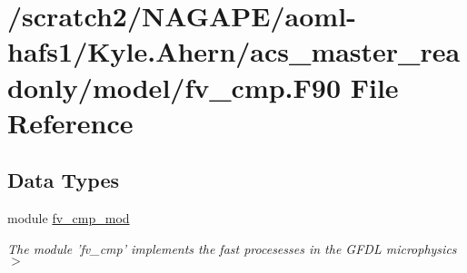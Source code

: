 \section{/scratch2/\-N\-A\-G\-A\-P\-E/aoml-\/hafs1/\-Kyle.Ahern/acs\-\_\-master\-\_\-readonly/model/fv\-\_\-cmp.F90 File Reference}
\label{fv__cmp_8F90}
\subsection*{Data Types}
\begin{DoxyCompactItemize}
\item 
module \hyperlink{classfv__cmp__mod}{fv\-\_\-cmp\-\_\-mod}
\begin{DoxyCompactList}\small\item\em The module 'fv\-\_\-cmp' implements the fast procesesses in the G\-F\-D\-L microphysics $>$ \end{DoxyCompactList}\end{DoxyCompactItemize}

